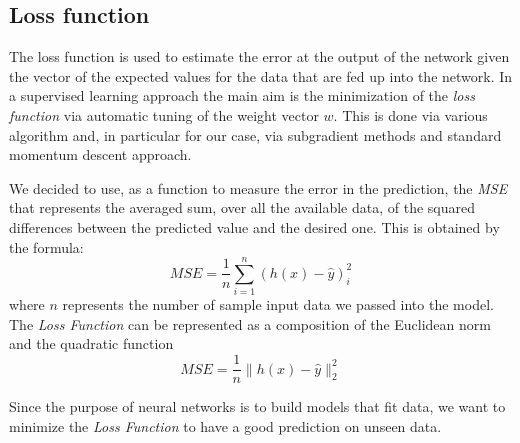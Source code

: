 \subsection{Loss function}
\label{Loss:Mse}
The loss function is used to estimate the error at the output of the network given the vector of the expected values for the data that are fed up into the network. In a supervised learning approach the main aim is the minimization of the \textit{loss function} via automatic tuning of the weight vector $w$. This is done via various algorithm and, in particular for our case, via subgradient methods and standard momentum descent approach.

We decided to use, as a function to measure the error in the prediction, the \textit{MSE} that represents the averaged sum, over all the available data, of the squared differences between the predicted value and the desired one.\newline
This is obtained by the formula: 	
\begin{equation}
MSE = \frac{1}{n} \sum_{i=1}^n (h(x) - \widehat{y})_{i}^2
\end{equation}
where $n$ represents the number of sample input data we passed into the model. 
The \textit{Loss Function} can be represented as a composition of the Euclidean norm and the quadratic function
\begin{equation}
MSE = \frac{1}{n} \parallel h(x) - \widehat{y} \parallel_{2}^2  
\end{equation}

Since the purpose of neural networks is to build models that fit data, we want to minimize the \textit{Loss Function} to have a good prediction on unseen data.\newline	
